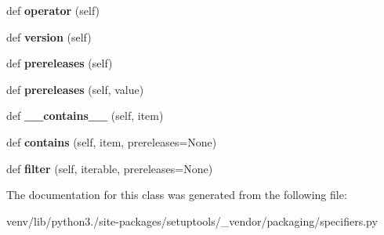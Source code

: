 \begin{DoxyCompactItemize}
def {\bfseries operator} (self)
\item 
\mbox{\label{classsetuptools_1_1__vendor_1_1packaging_1_1specifiers_1_1___individual_specifier_adbeb1ca50221bae20afba44631b69ea1}} 
def {\bfseries version} (self)
\item 
\mbox{\label{classsetuptools_1_1__vendor_1_1packaging_1_1specifiers_1_1___individual_specifier_a6d34f246410481ecb8ec832ff59c581e}} 
def {\bfseries prereleases} (self)
\item 
\mbox{\label{classsetuptools_1_1__vendor_1_1packaging_1_1specifiers_1_1___individual_specifier_adb887c73a585371527ef26bdf29dbefe}} 
def {\bfseries prereleases} (self, value)
\item 
\mbox{\label{classsetuptools_1_1__vendor_1_1packaging_1_1specifiers_1_1___individual_specifier_ac8c5634a825694d276f2cf5c4b3cb9bd}} 
def {\bfseries \+\_\+\+\_\+contains\+\_\+\+\_\+} (self, item)
\item 
\mbox{\label{classsetuptools_1_1__vendor_1_1packaging_1_1specifiers_1_1___individual_specifier_add310771a2fd25ae2670e7ed15c81160}} 
def {\bfseries contains} (self, item, prereleases=None)
\item 
\mbox{\label{classsetuptools_1_1__vendor_1_1packaging_1_1specifiers_1_1___individual_specifier_af07e3f018647cb7a004791b6436993e1}} 
def {\bfseries filter} (self, iterable, prereleases=None)
\end{DoxyCompactItemize}


The documentation for this class was generated from the following file\+:\begin{DoxyCompactItemize}
\item 
venv/lib/python3./site-\/packages/setuptools/\+\_\+vendor/packaging/specifiers.\+py\end{DoxyCompactItemize}
